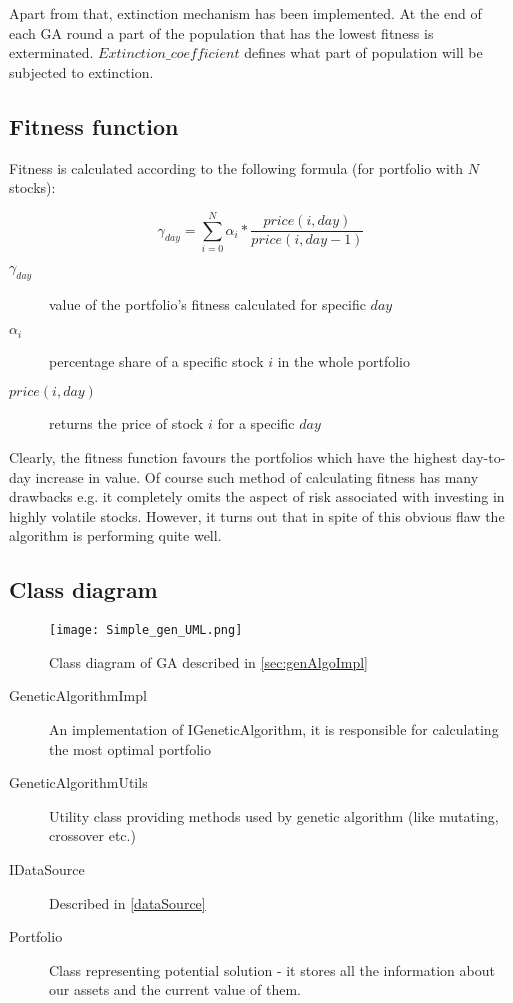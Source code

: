 Apart from that, extinction mechanism has been implemented.
At the end of each GA round a part of the population that has the lowest fitness is exterminated.
$Extinction\_coefficient$ defines what part of population will be subjected to extinction.
 
\subsection{Fitness function}
\label{sec:gen_fitness_fun}

Fitness is calculated according to the following formula (for portfolio with $N$ stocks):

\begin{equation}
    \gamma_{day} =  \sum_{i=0}^{N} {  \alpha_{i} * \frac{price(i,day)}{price(i,day - 1)} }
\end{equation}

\begin{description}
  \item [$\gamma_{day}$] 
      value of the portfolio's fitness calculated for specific $day$
  \item [$\alpha_{i}$]
      percentage share of a specific stock $i$ in the whole portfolio
  \item [$price(i,day)$]
      returns the price of stock $i$ for a specific $day$
\end{description}

Clearly, the fitness function favours the portfolios which have the highest day-to-day increase in value.
Of course such method of calculating fitness has many drawbacks e.g. it completely omits the aspect of risk associated with investing in highly volatile stocks.
However, it turns out that in spite of this obvious flaw the algorithm is performing quite well.  

\subsection{Class diagram}
\label{gen-class-diagram}

\begin{figure}[ht]   
	    \begin{center}
	      \texttt{[image: Simple\_gen\_UML.png]}
	    \end{center}
	    \caption{Class diagram of GA described in \ref{sec:genAlgoImpl}} 
	  \end{figure}

\begin{description}
  \item [GeneticAlgorithmImpl]
    An implementation of IGeneticAlgorithm, it is responsible for calculating the most optimal portfolio
  \item [GeneticAlgorithmUtils]
    Utility class providing methods used by genetic algorithm (like mutating, crossover etc.)
  \item [IDataSource]
    Described in \ref{dataSource}
  \item [Portfolio]
    Class representing potential solution - it stores all the information about our assets and the current value of them.

\end{description}

